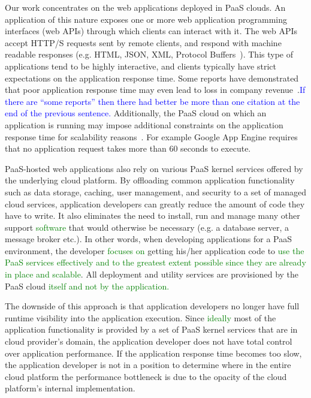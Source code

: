Our work concentrates on the web
applications deployed in PaaS clouds. An application of this nature exposes
one or more web application programming interfaces (web APIs) through which
clients can interact with it. The web APIs accept HTTP/S requests sent by
remote clients, and respond with machine readable responses (e.g. HTML, JSON,
XML, Protocol Buffers~\cite{XXX}). This type of applications tend to be highly
interactive, and clients typically have strict expectations on the application
response time. Some reports have demonstrated that poor application response
time may even lead to loss in company revenue~\cite{XXX}.\textcolor{blue}{If
there are ``some reports'' then there had better be more than one citation at the
end of the previous sentence.} Additionally, the PaaS cloud on
which an application is running may impose additional constraints on the
application response time for scalability
reasons~\cite{azure-limits,gae-limits}.  For example Google App Engine
requires that no application request takes more than 60 seconds to execute.

PaaS-hosted web applications also rely on various PaaS kernel services offered by the underlying
cloud platform. By offloading common application functionality such as data storage, caching,
user management, and security to a set of managed cloud services, application developers
can greatly reduce the amount of code they have to write. It also eliminates the need to install, run and
manage many other support \textcolor{green}{software} that would otherwise be necessary (e.g. a database server, 
a message broker etc.). In other words, when developing applications for a PaaS environment, the
developer \textcolor{green}{focuses on} getting his/her application code to
\textcolor{green}{use the PaaS services effectively and to the greatest extent
possible since they are already in place and scalable}. All deployment
and utility services are provisioned by the PaaS cloud \textcolor{green}{itself and not by the
application.} 

The downside of this approach is that application developers no longer have full runtime visibility
into the application execution. Since \textcolor{green}{ideally} 
most of the application functionality is provided by a set 
of PaaS kernel services that are in cloud provider's domain, the application
developer does not have total control over application performance. If the application 
response time becomes too slow, the application developer is not in a position to determine
where in the entire cloud platform the performance bottleneck is due to the opacity of the cloud
platform's internal implementation. 

